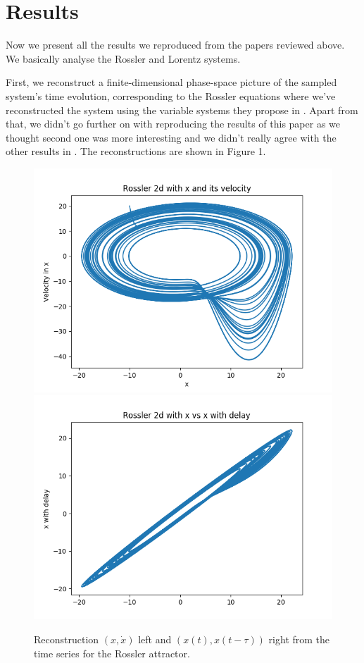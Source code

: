 \documentclass[10pt]{article}
\begin{document}
\section{Results}

Now we present all the results we reproduced from the papers reviewed above. We basically analyse the Rossler and Lorentz systems.

First, we reconstruct a finite-dimensional phase-space picture of the sampled system's time evolution, corresponding to the Rossler equations where we've reconstructed the system using the variable systems they propose in \cite{paper1}. Apart from that, we didn't go further on with reproducing the results of this paper as we thought second one was more interesting and we didn't really agree with the other results in \cite{paper1}. The reconstructions are shown in Figure 1.

\begin{figure}[h!]
\centering
\includegraphics[scale=0.45]{rossler_x_xprima.png}
\includegraphics[scale=0.45]{rossler_x_xdelay.png}
\label{fig:rossler_x_xprima}
\caption{Reconstruction $(x,\dot x)$ left and $\left(x(t),x(t-\tau)\right)$ right from the time series for the Rossler attractor.}
\end{figure}
\end{document}
